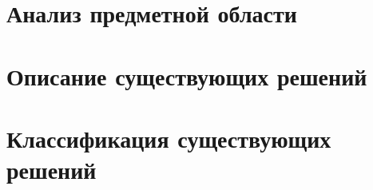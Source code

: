 \section{Анализ предметной области}

\section{Описание существующих решений}

\section{Классификация существующих решений}

